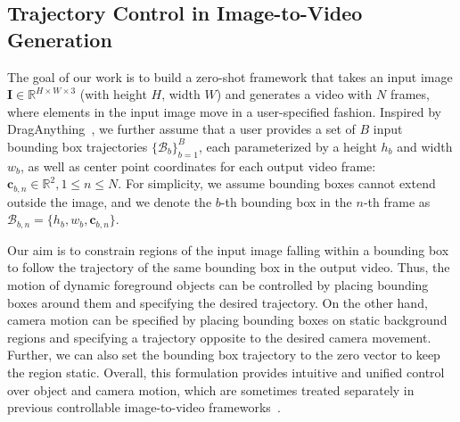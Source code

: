 \subsection{Trajectory Control in Image-to-Video Generation} %
\label{sec:3_task}
The goal of our work is to build a zero-shot framework that takes an input image $\mathbf{I} \in \mathbb{R}^{H \times W \times 3}$ (with height $H$, width $W$) and generates a video with $N$ frames, where elements in the input image move in a user-specified fashion.
Inspired by DragAnything~\citep{wu2024draganything}, we further assume that a user provides a set of $B$ input bounding box trajectories $\{\mathcal{B}_b\}_{b=1}^B$, each parameterized by a height $h_b$ and width $w_b$, as well as center point coordinates  for each output video frame: $\mathbf{c}_{b, n}\in\mathbb{R}^2, 1\leq n \leq N$.
For simplicity, we assume bounding boxes cannot extend outside the image, and we denote the $b$-th bounding box in the $n$-th frame as $\mathcal{B}_{b, n} = \{h_b, w_b, \mathbf{c}_{b,n}\}$. 

Our aim is to constrain regions of the input image falling within a bounding box to follow the trajectory of the same bounding box in the output video.
Thus, the motion of dynamic foreground objects can be controlled by placing bounding boxes around them and specifying the desired trajectory.
On the other hand, camera motion can be specified by placing bounding boxes on static background regions and specifying a trajectory opposite to the desired camera movement. %
Further, we can also set the bounding box trajectory to the zero vector to keep the region static.
Overall, this formulation provides intuitive and unified control over object and camera motion, which are sometimes treated separately in previous controllable image-to-video frameworks~\citep{MotionCtrl, DirectAVideo, li2024image}.



